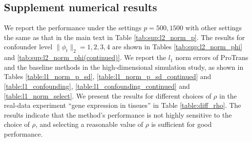 \documentclass[12pt]{article}
\begin{document}
\subsection{Supplement numerical results}
We report the performance under the settings $p=500,1500$ with other settings the same as that in the main text in Table \ref{tab:sup:l2_norm_p}. The results for confounder level $\|\phi_t\|_2 = 1,2,3,4$ are shown in Tables \ref{tab:sup:l2_norm_phi} and \ref{tab:sup:l2_norm_phi(continued)}. We report the $l_1$ norm errors of ProTrans and the baseline methods in the high-dimensional simulation study, as shown in Tables \ref{table:l1_norm_p_sd}, \ref{table:l1_norm_p_sd_continued} and \ref{table:l1_confounding}, \ref{table:l1_confounding_continued} and \ref{table:l1_norm_select}. We present the results for different choices of $\rho$ in the real-data experiment ``gene expression in tissues'' in Table \ref{table:diff_rho}. The results indicate that the method's performance is not highly sensitive to the choice of $\rho$, and selecting a reasonable value of $\rho$ is sufficient for good performance. 
\end{document}
